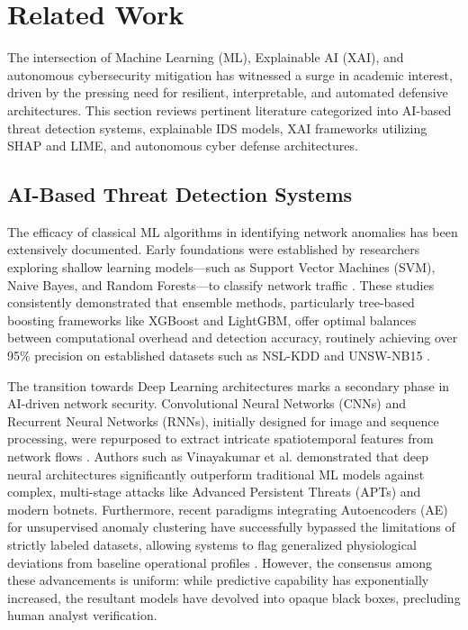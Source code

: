 \documentclass[conference]{IEEEtran}
\begin{document}
\section{Related Work}

The intersection of Machine Learning (ML), Explainable AI (XAI), and autonomous cybersecurity mitigation has witnessed a surge in academic interest, driven by the pressing need for resilient, interpretable, and automated defensive architectures. This section reviews pertinent literature categorized into AI-based threat detection systems, explainable IDS models, XAI frameworks utilizing SHAP and LIME, and autonomous cyber defense architectures.

\subsection{AI-Based Threat Detection Systems}
The efficacy of classical ML algorithms in identifying network anomalies has been extensively documented. Early foundations were established by researchers exploring shallow learning models—such as Support Vector Machines (SVM), Naive Bayes, and Random Forests—to classify network traffic \cite{moustafa2015unsw, alotaibi2023adaptive}. These studies consistently demonstrated that ensemble methods, particularly tree-based boosting frameworks like XGBoost and LightGBM, offer optimal balances between computational overhead and detection accuracy, routinely achieving over 95\% precision on established datasets such as NSL-KDD and UNSW-NB15 \cite{chen2016xgboost, ke2017lightgbm}. 

The transition towards Deep Learning architectures marks a secondary phase in AI-driven network security. Convolutional Neural Networks (CNNs) and Recurrent Neural Networks (RNNs), initially designed for image and sequence processing, were repurposed to extract intricate spatiotemporal features from network flows \cite{ahmad2020network}. Authors such as Vinayakumar et al. \cite{wang2021explainable} demonstrated that deep neural architectures significantly outperform traditional ML models against complex, multi-stage attacks like Advanced Persistent Threats (APTs) and modern botnets. Furthermore, recent paradigms integrating Autoencoders (AE) for unsupervised anomaly clustering have successfully bypassed the limitations of strictly labeled datasets, allowing systems to flag generalized physiological deviations from baseline operational profiles \cite{lundberg2017unified, ribeiro2016should}. However, the consensus among these advancements is uniform: while predictive capability has exponentially increased, the resultant models have devolved into opaque black boxes, precluding human analyst verification.
\end{document}
